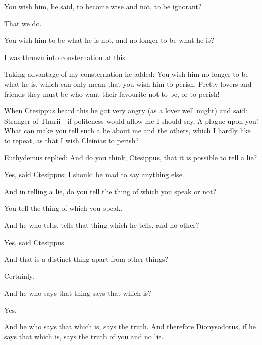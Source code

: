 \documentclass[11pt,letter]{article}
\begin{document}
\par  You wish him, he said, to become wise and not, to be ignorant?

\par  That we do.

\par  You wish him to be what he is not, and no longer to be what he is?

\par  I was thrown into consternation at this.

\par  Taking advantage of my consternation he added: You wish him no longer to be what he is, which can only mean that you wish him to perish. Pretty lovers and friends they must be who want their favourite not to be, or to perish!

\par  When Ctesippus heard this he got very angry (as a lover well might) and said: Stranger of Thurii—if politeness would allow me I should say, A plague upon you! What can make you tell such a lie about me and the others, which I hardly like to repeat, as that I wish Cleinias to perish?

\par  Euthydemus replied: And do you think, Ctesippus, that it is possible to tell a lie?

\par  Yes, said Ctesippus; I should be mad to say anything else.

\par  And in telling a lie, do you tell the thing of which you speak or not?

\par  You tell the thing of which you speak.

\par  And he who tells, tells that thing which he tells, and no other?

\par  Yes, said Ctesippus.

\par  And that is a distinct thing apart from other things?

\par  Certainly.

\par  And he who says that thing says that which is?

\par  Yes.

\par  And he who says that which is, says the truth. And therefore Dionysodorus, if he says that which is, says the truth of you and no lie.
\end{document}
